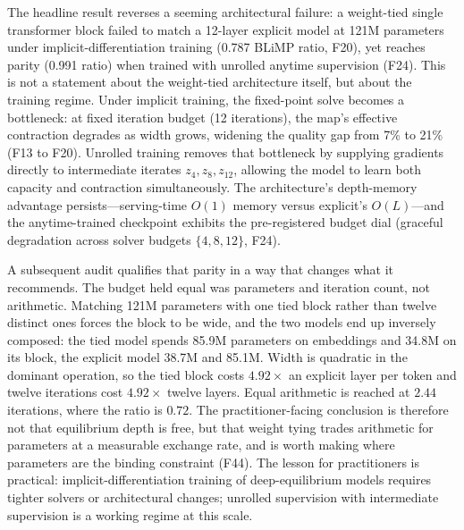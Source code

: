 
The headline result reverses a seeming architectural failure: a weight-tied single transformer block failed to match a 12-layer explicit model at 121M parameters under implicit-differentiation training (0.787 BLiMP ratio, F20), yet reaches parity (0.991 ratio) when trained with unrolled anytime supervision (F24). This is not a statement about the weight-tied architecture itself, but about the training regime. Under implicit training, the fixed-point solve becomes a bottleneck: at fixed iteration budget (12 iterations), the map's effective contraction degrades as width grows, widening the quality gap from 7\% to 21\% (F13 to F20). Unrolled training removes that bottleneck by supplying gradients directly to intermediate iterates $z_4, z_8, z_{12}$, allowing the model to learn both capacity and contraction simultaneously. The architecture's depth-memory advantage persists---serving-time $O(1)$ memory versus explicit's $O(L)$---and the anytime-trained checkpoint exhibits the pre-registered budget dial (graceful degradation across solver budgets $\{4,8,12\}$, F24).

A subsequent audit qualifies that parity in a way that changes what it recommends. The budget held equal was parameters and iteration count, not arithmetic. Matching 121M parameters with one tied block rather than twelve distinct ones forces the block to be wide, and the two models end up inversely composed: the tied model spends 85.9M parameters on embeddings and 34.8M on its block, the explicit model 38.7M and 85.1M. Width is quadratic in the dominant operation, so the tied block costs $4.92\times$ an explicit layer per token and twelve iterations cost $4.92\times$ twelve layers. Equal arithmetic is reached at $2.44$ iterations, where the ratio is $0.72$. The practitioner-facing conclusion is therefore not that equilibrium depth is free, but that weight tying trades arithmetic for parameters at a measurable exchange rate, and is worth making where parameters are the binding constraint (F44). The lesson for practitioners is practical: implicit-differentiation training of deep-equilibrium models requires tighter solvers or architectural changes; unrolled supervision with intermediate supervision is a working regime at this scale.

